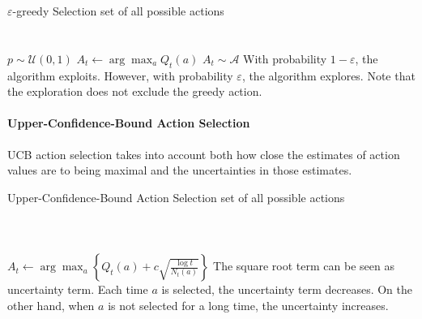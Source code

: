 \documentclass[../../main.tex]{subfiles}
\begin{document}
            {$\varepsilon$-greedy Selection}
            { {set of all possible actions } \\
                \\
                \\
            }
            {
            }
            {
                $p \sim \mathcal{U}(0,1)$\;
                {
                    $A_t \leftarrow \arg\max_a{Q_t(a)}$\;
                }
                {
                    $A_t \sim \mathcal{A}$\;
                }
            }
            With probability $1-\varepsilon$, the algorithm exploits. However, with probability $\varepsilon$, the algorithm explores.
            Note that the exploration does not exclude the greedy action.
            
            \paragraph{Upper-Confidence-Bound Action Selection}
            UCB action selection takes into account both how close the estimates of action values are to being maximal and the uncertainties in those estimates.
            
            {Upper-Confidence-Bound Action Selection}
            { {set of all possible actions } \\
                \\
                \\
                \\
            }
            {
            }
            {
                $A_t \leftarrow \arg \max_a\left\{ Q_t(a) + \displaystyle{c\sqrt{\frac{\log{t}}{N_t(a)}}} \right\}$\;
            }
            The square root term can be seen as uncertainty term. Each time $a$ is selected, the uncertainty term decreases. On the other hand, when $a$ is not selected for a long time,
            the uncertainty increases.
\end{document}
